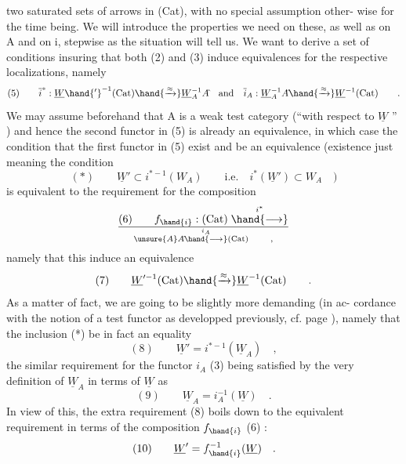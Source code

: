 two saturated sets of arrows in (Cat), with no special assumption other-%
wise for the time being. We will introduce the properties we need on
these, as well as on A and on i, stepwise as the situation will tell us.
We want to derive a set of conditions insuring that both (2) and (3)
induce equivalences for the respective localizations, namely
\[ (5) \qquad \overline{i}^{*} : \underline{W}\hand{'}^{-1}(\mathrm{Cat}) \hand{\xrightarrow{\approx}} \underline{W}_A^{-1}A\hat{} \quad\text{and}\quad \overline{i}_A : \underline{W}_A^{-1}A\hat{} \hand{\xrightarrow{\approx}} \underline{W}^{-1}(\mathrm{Cat}) \qquad . \]
We may assume beforehand that A is a weak test category (``with respect to
$\underline{W}$ '' ) and hence the second functor in (5) is already an equivalence,
in which case the condition that the first functor in (5) exist and be an
equivalence (existence just meaning the condition
\[ (*) \qquad \underline{W}' \subset i^{* -1}(W_A) \qquad \text{i.e.} \quad i^{*}(\underline{W}') \subset W_A \quad ) \]
is equivalent to the  requirement for the composition
\[ (6) \qquad f_{\hand{i}} : (\mathrm{Cat}) \mathrel{\overset{i^{*}}{\hand{\longrightarrow}}} \over{\unsure{A}}{A}\hat{} \mathrel{\overset{i_A}{\hand{\longrightarrow}}} (\mathrm{Cat}) \qquad , \]
namely that this induce an equivalence
\[ (7) \qquad \underline{W}'^{-1}(\mathrm{Cat}) \hand{\xrightarrow{\approx}} \underline{W}^{-1}(\mathrm{Cat}) \qquad . \]
As a matter of fact, we are going to be slightly more demanding (in ac-%
cordance with the notion of a  test functor as developped previously,
cf. page  ), namely that the inclusion (*) be in fact an equality
\[ (8) \qquad \underline{W}' = i^{* -1}(\underline{W}_A) \quad , \]
the similar requirement for the functor $i_A$ (3) being satisfied by the
very definition of $\underline{W}_A$ in terms of $\underline{W}$ as
\[ (9) \qquad \underline{W}_A = i_A^{-1}(\underline{W}) \quad . \]
In view of this, the extra requirement (8) boils down to the equivalent
requirement in terms of the composition $f_{\hand{i}}$ (6) :
\[ (10) \qquad \underline{W}' = f_{\hand{i}}^{-1}(\underline{W}) \quad . \]

